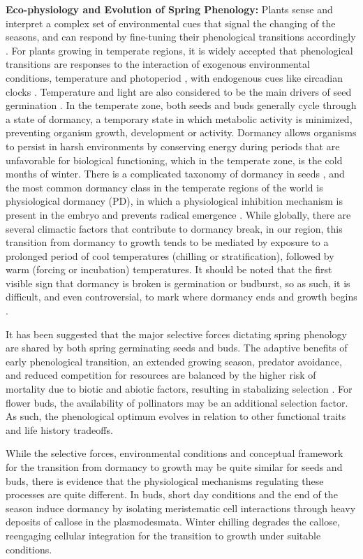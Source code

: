 \documentclass{article}\usepackage[]{graphicx}\usepackage[]{color}
\begin{document}
\indent\indent\textbf{Eco-physiology and Evolution of Spring Phenology:} Plants sense and interpret a complex set of environmental cues that signal the changing of the seasons, and can respond by fine-tuning their phenological transitions accordingly \citep{Vitasse2010}. For plants growing in temperate regions, it is widely accepted that phenological transitions are responses to the interaction of exogenous environmental conditions, temperature and photoperiod \citep{Forrest2010}, with endogenous cues like circadian clocks \citep{Visser2010}. Temperature and light are also considered to be the main drivers of seed germination \citep{Finch-Savage2006}. In the temperate zone, both seeds and buds generally cycle through a state of dormancy, a temporary state in which metabolic activity is minimized, preventing organism growth, development or activity. Dormancy allows organisms to persist in harsh environments by conserving energy during periods that are unfavorable for biological functioning, which in the temperate zone, is the cold months of winter. There is a complicated taxonomy of dormancy in seeds \citep{Baskin2004}, and the most common dormancy class in the temperate regions of the world is physiological dormancy (PD), in which a physiological inhibition mechanism is present in the embryo and prevents radical emergence \citep{Finch-Savage2006}. While globally, there are several climactic factors that contribute to dormancy break, in our region, this transition from dormancy to growth tends to be mediated by exposure to a prolonged period of cool temperatures (chilling or stratification), followed by warm (forcing or incubation) temperatures. It should be noted that the first visible sign that dormancy is broken is germination or budburst, so as such, it is difficult, and even controversial, to mark where dormancy ends and growth begins \citep{Long2015,Bewley1997}.
\par It has been suggested that the major selective forces dictating spring phenology are shared by both spring germinating seeds and buds. The adaptive benefits of early phenological transition, an extended growing season, predator avoidance, and reduced competition for resources are balanced by the higher risk of mortality due to biotic and abiotic factors, resulting in stabalizing selection \citep{Rathcke1985}. For flower buds, the availability of pollinators may be an additional selection factor. As such, the phenological optimum evolves in relation to other functional traits and life history tradeoffs. 
\par While the selective forces, environmental conditions and conceptual framework for the transition from dormancy to growth may be quite similar for seeds and buds, there is evidence that the physiological mechanisms regulating these processes are quite different. In buds, short day conditions and the end of the season induce dormancy by isolating meristematic cell interactions through heavy deposits of callose in the plasmodesmata\citep{Rinne2011,Sager2014}. Winter chilling degrades the callose, reengaging cellular integration for the transition to growth under suitable conditions. 
\end{document}
